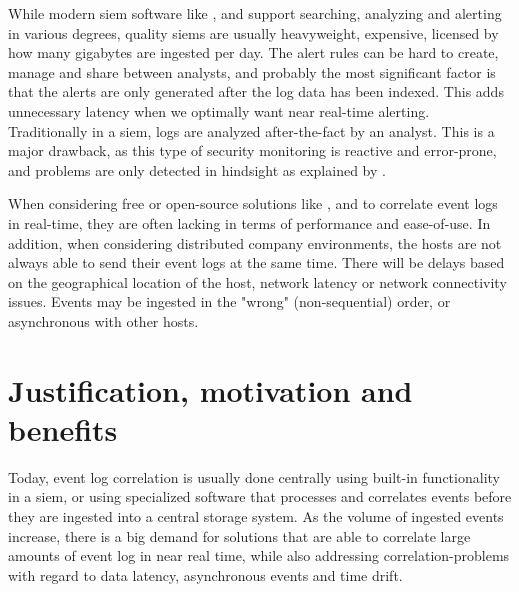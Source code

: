 While modern \acrshort{siem} software like \textcite{Splunk}, \textcite{QRadar} and \textcite{NetWitness} support searching, analyzing and alerting in various degrees, quality \acrshort{siem}s are usually heavyweight, expensive, licensed by how many gigabytes are ingested per day. The alert rules can be hard to create, manage and share between analysts, and probably the most significant factor is that the alerts are only generated after the log data has been indexed. This adds unnecessary latency when we optimally want near real-time alerting. Traditionally in a \acrshort{siem}, logs are analyzed after-the-fact by an analyst. This is a major drawback, as this type of security monitoring is reactive and error-prone, and problems are only detected in hindsight as explained by \textcite{Landauer_2020}.

When considering free or open-source solutions like \textcite{OSSIM}, \textcite{OSSEC} and \textcite{SEC-website} to correlate event logs in real-time, they are often lacking in terms of performance and ease-of-use.
In addition, when considering distributed company environments, the hosts are not always able to send their event logs at the same time. There will be delays based on the geographical location of the host, network latency or network connectivity issues. Events may be ingested in the "wrong" (non-sequential) order, or asynchronous with other hosts.

\section{Justification, motivation and benefits}
\label{sec:motivation}
Today, event log correlation is usually done centrally using built-in functionality in a \acrshort{siem}, or using specialized software that processes and correlates events before they are ingested into a central storage system.
As the volume of ingested events increase, there is a big demand for solutions that are able to correlate large amounts of event log in near real time, while also addressing correlation-problems with regard to data latency, asynchronous events and time drift.


